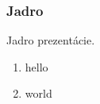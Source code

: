 \begin{frame}
	\frametitle{Jadro}
	
	Jadro prezentácie.
	
	\begin{enumerate}
		\item hello
		\item world
	\end{enumerate}
\end{frame}